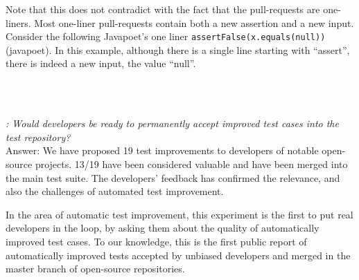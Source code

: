 Note that this does not contradict with the fact that the pull-requests are one-liners. Most one-liner pull-requests contain both a new assertion and a new input. Consider the following Javapoet's one liner \texttt{assertFalse(x.equals(null))} (javapoet). In this example, although there is a single line starting with ``assert'', there is indeed a new input, the value ``null''.

~\\
~\\
\begin{mdframed}
	\textit{\rqpullrequest: Would developers be ready to permanently accept improved test cases into the test repository?}\\
	Answer: We have proposed 19 test improvements to developers of notable open-source projects. 13/19 have been considered valuable and have been merged into the main test suite. The developers' feedback has confirmed the relevance, and also the challenges of automated test improvement.
\end{mdframed}

In the area of automatic test improvement, this experiment is the first to put real developers in the loop, by asking them about the quality of automatically improved test cases. To our knowledge, this is the first public report of automatically improved tests accepted by unbiased developers and merged in the master branch of open-source repositories.


